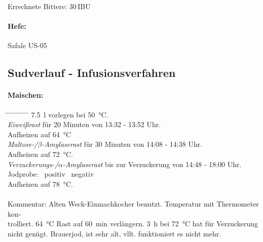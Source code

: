 \documentclass[12pt,oneside,a4paper]{scrartcl}
\begin{document}
\vspace{.25cm}
\hspace{1cm}Errechnete Bittere: 30\,IBU
%
\paragraph{Hefe:}
	Safale US-05

%
\subsection*{Sudverlauf - Infusionsverfahren}	

\paragraph{Maischen:}
	\begin{tabbing}\hspace{1cm} \=
		\hspace{1cm} \= \hspace{1cm} \=\hspace{1cm} \=\hspace{1cm} \=\hspace{1cm} \= \hspace{1cm} \= \hspace{1cm} \= \hspace{1cm} \= \hspace{1cm} \= \kill
		\> \SI{7,5}{\litre} vorlegen bei \SI{50}{\celsius}.\\
		\> \textit{Eiweißrast} für 20 Minuten von 13:32 - 13:52 Uhr.\\
		\> \> Aufheizen auf \SI{64}{\celsius}\\
		\> \textit{Maltose-/$\beta$-Amylaserast} für 30 Minuten von 14:08 - 14:38 Uhr.\\
		\> \> Aufheizen auf \SI{72}{\celsius}.\\
		\> \textit{Verzuckerungs-/$\alpha$-Amylaserast} bis zur Verzuckerung von 14:48 - 18:00 Uhr.\\
		\> \> \> Jodprobe: \> \> \CheckedBox \ positiv \> \> \Square \ negativ\\
		\> \> Aufheizen auf \SI{78}{\celsius}.\\\\
		\> Kommentar: \>\>\> Alten Weck-Einmachkocher benutzt. Temperatur mit Thermometer kon-\\
		\>\>\>trolliert. \SI{64}{\celsius} Rast auf \SI{60}{\minute} verlängern. \SI{3}{\hour} bei \SI{72}{\celsius} hat für Verzuckerung \\
		\>\>\>nicht genügt. Brauerjod, ist sehr alt, vllt. funktioniert es nicht mehr.\\
	\end{tabbing}
\end{document}

